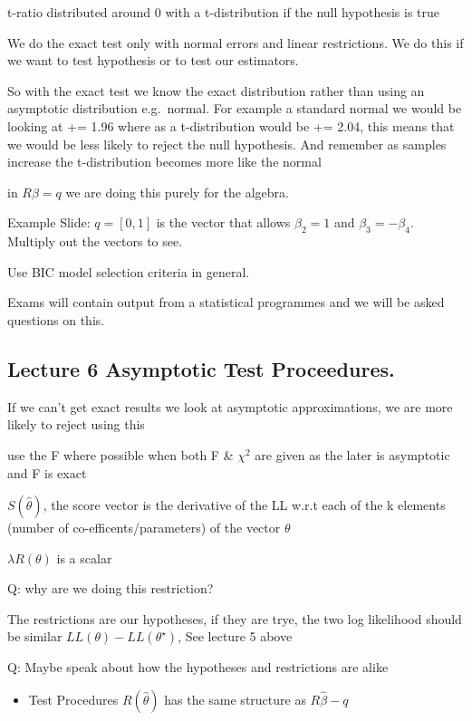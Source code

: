 \documentclass[]{article}
\providecommand{\tightlist}{%
  \setlength{\itemsep}{0pt}\setlength{\parskip}{0pt}}
\begin{document}
t-ratio distributed around 0 with a t-distribution if the null
hypothesis is true

We do the exact test only with normal errors and linear restrictions. We
do this if we want to test hypothesis or to test our estimators.

So with the exact test we know the exact distribution rather than using
an asymptotic distribution e.g.~normal. For example a standard normal we
would be looking at += 1.96 where as a t-distribution would be += 2.04,
this means that we would be less likely to reject the null hypothesis.
And remember as samples increase the t-distribution becomes more like
the normal

in \(R \beta = q\) we are doing this purely for the algebra.

Example Slide: \(q = [0, 1]\) is the vector that allows \(\beta_2 =1\)
and \(\beta_3 = -\beta_4\). Multiply out the vectors to see.

Use BIC model selection criteria in general.

Exams will contain output from a statistical programmes and we will be
asked questions on this.

\subsection{Lecture 6 Asymptotic Test
Proceedures.}\label{lecture-6-asymptotic-test-proceedures.}

If we can't get exact results we look at asymptotic approximations, we
are more likely to reject using this

use the F where possible when both F \& \(\chi^2\) are given as the
later is asymptotic and F is exact

\(S(\hat\theta)\), the score vector is the derivative of the LL w.r.t
each of the k elements (number of co-efficents/parameters) of the vector
\(\theta\)

\(\lambda R(\theta)\) is a scalar

Q: why are we doing this restriction?

The restrictions are our hypotheses, if they are trye, the two log
likelihood should be similar \(LL(\theta) - LL(\theta^\star)\), See
lecture 5 above

Q: Maybe speak about how the hypotheses and restrictions are alike

\begin{itemize}
\tightlist
\item
  Test Procedures \(R(\hat\theta)\) has the same structure as
  \(R\hat{\beta} - q\)
\end{itemize}
\end{document}
